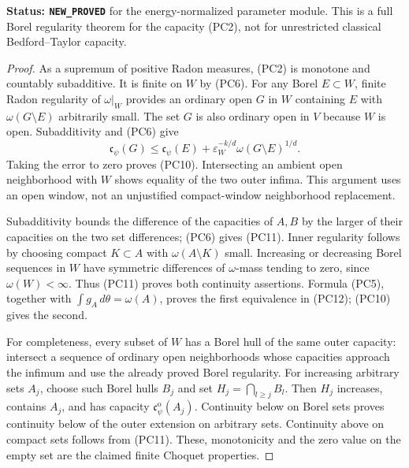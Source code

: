 \noindent\textbf{Status: \texttt{NEW\_PROVED}} for the
energy-normalized parameter module. This is a full Borel
regularity theorem for the capacity (PC2), not for unrestricted
classical Bedford--Taylor capacity.

\begin{proof}
As a supremum of positive Radon measures, (PC2) is monotone and
countably subadditive. It is finite on $W$ by (PC6). For any
Borel $E\subset W$, finite Radon regularity of $\omega|_W$
provides an ordinary open $G$ in $W$ containing $E$ with
$\omega(G\setminus E)$ arbitrarily small. The set $G$ is also
ordinary open in $V$ because $W$ is open. Subadditivity and
(PC6) give
\[
             \mathfrak c_\psi(G)
               \le\mathfrak c_\psi(E)
                      +\varepsilon_W^{-k/d}\omega(G\setminus E)^{1/d}.
\]
Taking the error to zero proves (PC10). Intersecting an ambient
open neighborhood with $W$ shows equality of the two outer
infima. This argument uses an open window, not an unjustified
compact-window neighborhood replacement.

Subadditivity bounds the difference of the capacities of $A,B$
by the larger of their capacities on the two set differences;
(PC6) gives (PC11). Inner regularity follows by choosing compact
$K\subset A$ with $\omega(A\setminus K)$ small. Increasing
or decreasing Borel sequences in $W$ have symmetric differences
of $\omega$-mass tending to zero, since $\omega(W)<\infty$.
Thus (PC11) proves both continuity assertions. Formula (PC5),
together with $\int g_A\,d\theta=\omega(A)$, proves the first
equivalence in (PC12); (PC10) gives the second.

For completeness, every subset of $W$ has a Borel hull of the
same outer capacity: intersect a sequence of ordinary open
neighborhoods whose capacities approach the infimum and use
the already proved Borel regularity. For increasing arbitrary
sets $A_j$, choose such Borel hulls $B_j$ and set
$H_j=\bigcap_{l\ge j}B_l$. Then $H_j$ increases, contains
$A_j$, and has capacity $\mathfrak c_\psi^{\mathrm o}(A_j)$.
Continuity below on Borel sets proves continuity below of the
outer extension on arbitrary sets. Continuity above on compact
sets follows from (PC11). These, monotonicity and the zero value
on the empty set are the claimed finite Choquet properties.
\end{proof}

